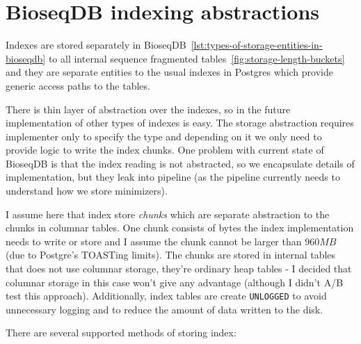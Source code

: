\section{BioseqDB indexing abstractions}
\label{sec:index-abstraction-layers}

Indexes are stored separately in BioseqDB~\ref{lst:types-of-storage-entities-in-bioseqdb} to all internal sequence fragmented tables~\ref{fig:storage-length-buckets} 
and they are separate entities to the usual indexes in Postgres which provide generic access paths to the tables.

There is thin layer of abstraction over the indexes, so in the future implementation of other types of indexes is easy. The storage abstraction 
requires implementer only to specify the type and depending on it we only need to provide logic to write the index chunks.
One problem with current state of BioseqDB is that the index reading is not abstracted, so we encapsulate details of implementation, but they leak into pipeline (as the pipeline 
currently needs to understand how we store minimizers).


I assume here that index store \emph{chunks} which are separate abstraction to the chunks in columnar tables.
One chunk consists of bytes the index implementation needs to write or store and I assume the chunk cannot be larger than $960MB$ (due to Postgre's TOASTing limits). 
The chunks are stored in internal tables that does not use columnar storage, they're ordinary heap tables - I decided that columnar storage in this case won't give any advantage (although I didn't A/B test this approach).
Additionally, index tables are create \texttt{UNLOGGED} to avoid unnecessary logging and to reduce the amount of data written to the disk.

There are several supported methods of storing index:

